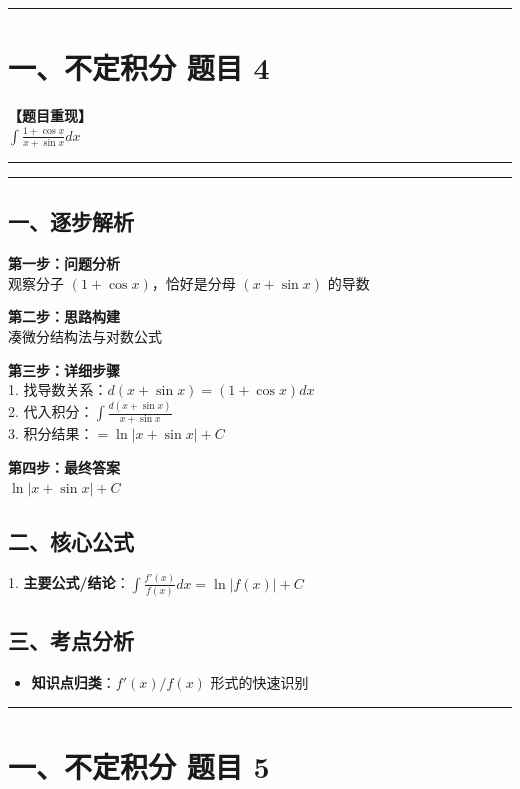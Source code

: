 ﻿\documentclass[12pt, a4paper]{ctexart}
\newcommand{\TopSeparator}{
    \par\noindent\rule{\textwidth}{1.5pt}\vspace{0.5em}
}
\newcommand{\AnalysisSeparator}{
    \par\noindent\rule{\textwidth}{0.5pt}\vspace{0.2em}\hrule\vspace{0.5em}
}
\newenvironment{RedAnalysis}{
    \par
    \color{red} 
}{
    \par
    \color{black} 
}
\begin{document}
\vspace{2em}

\TopSeparator
\section*{一、不定积分 题目 4}

\textbf{【题目重现】} \\
$\int \frac{1+\cos x}{x+\sin x} dx$

\AnalysisSeparator

\begin{RedAnalysis}

	\subsection*{一、逐步解析}

	\textbf{第一步：问题分析} \\
	观察分子 $(1+\cos x)$，恰好是分母 $(x+\sin x)$ 的导数

	\textbf{第二步：思路构建} \\
	凑微分结构法与对数公式

	\textbf{第三步：详细步骤} \\
	1. 找导数关系：$d(x+\sin x) = (1+\cos x)dx$ \\ 
	2. 代入积分：$\int \frac{d(x+\sin x)}{x+\sin x}$ \\ 
	3. 积分结果：$ = \ln|x+\sin x| + C$

	\textbf{第四步：最终答案} \\
	$\ln|x+\sin x| + C$

	\subsection*{二、核心公式}
	1. \textbf{主要公式/结论}：$\int \frac{f'(x)}{f(x)} dx = \ln|f(x)| + C$

	\subsection*{三、考点分析}
	\begin{itemize}
		\item \textbf{知识点归类}：$f'(x)/f(x)$ 形式的快速识别
	\end{itemize}

\end{RedAnalysis}

\vspace{2em}

\TopSeparator
\section*{一、不定积分 题目 5}
\end{document}
